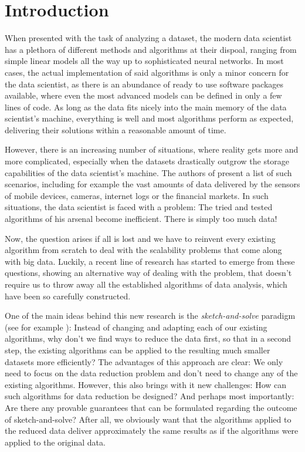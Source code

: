 \section{Introduction}

When presented with the task of analyzing a dataset, the modern
data scientist has a plethora of different methods and algorithms
at their dispoal, ranging from simple linear models all the way up to
sophisticated neural networks.
In most cases, the actual implementation of said algorithms is only
a minor concern for the data scientist, as there is an abundance of
ready to use software packages available, where even the most
advanced models can be defined in only a few lines of code.
As long as the data fits nicely into the main memory of the
data scientist's machine, everything is well and most algorithms
perform as expected, delivering their solutions within a reasonable
amount of time.

However, there is an increasing number of situations, where
reality gets more and more complicated, especially when the
datasets drastically outgrow the storage capabilities
of the data scientist's machine.
The authors of \cite{big-data-tiny-data} present a list of such
scenarios, including for example the vast amounts of data
delivered by the sensors of mobile devices, cameras,
internet logs or the financial markets.
In such situations, the data scientist is faced with a problem:
The tried and tested algorithms of his arsenal become inefficient.
There is simply too much data!

Now, the question arises if all is lost and we have to reinvent
every existing algorithm from scratch to deal with the scalability
problems that come along with big data.
Luckily, a recent line of research has started to emerge from
these questions, showing an alternative way of dealing with
the problem, that doesn't require us to throw away all the established
algorithms of data analysis, which have been so carefully constructed.

One of the main ideas behind this new research is the
\textit{sketch-and-solve} paradigm
(see for example \cite{woodruff-2014}):
Instead of changing and adapting each of our existing algorithms,
why don't we find ways to reduce the data first,
so that in a second step, the existing algorithms can be
applied to the resulting much smaller datasets more efficiently?
The advantages of this approach are clear: We only need to
focus on the data reduction problem and don't need to change
any of the existing algorithms. However, this also brings
with it new challenges: How can such algorithms for data
reduction be designed? And perhaps most importantly:
Are there any provable guarantees that can be formulated
regarding the outcome of sketch-and-solve?
After all, we obviously want that the algorithms applied to
the reduced data deliver approximately the same results as
if the algorithms were applied to the original data.

